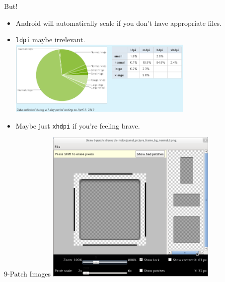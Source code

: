 \documentclass{beamer}
\begin{document}
\begin{frame}{But!}
\begin{itemize}
\item Android will automatically scale if you don't have appropriate
  files.
\item \texttt{ldpi} maybe irrelevant.\\
\includegraphics[width=3.5in]{densities.png}
\item Maybe just \texttt{xhdpi} if you're feeling brave.
\end{itemize}
\end{frame}

\begin{frame}{9-Patch Images}
\includegraphics[width=3.25in]{draw9patch.png}
\end{frame}

\end{document}
